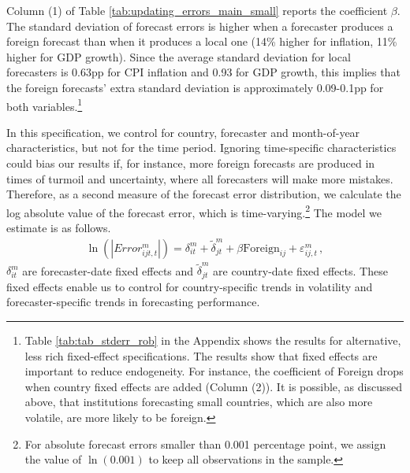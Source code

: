 Column (1) of Table \ref{tab:updating_errors_main_small} reports the coefficient $\beta$. The standard deviation of forecast errors is higher when a forecaster produces a foreign forecast than when it produces a local one (14\% higher for inflation, 11\% higher for GDP growth). Since the average standard deviation for local forecasters is 0.63pp for CPI inflation and 0.93 for GDP growth, this implies that the foreign forecasts' extra standard deviation is approximately 0.09-0.1pp for both variables.\footnote{Table \ref{tab:tab_stderr_rob} in the Appendix shows the results for alternative, less rich fixed-effect specifications. The results show that fixed effects are important to reduce endogeneity. For instance, the coefficient of Foreign drops when country fixed effects are added (Column (2)). It is possible, as discussed above, that institutions forecasting small countries, which are also more volatile, are more likely to be foreign.}

{
	
}


In this specification, we control for country, forecaster and month-of-year characteristics, but not for the time period. Ignoring time-specific characteristics could bias our results if, for instance, more foreign forecasts are produced in times of turmoil and uncertainty, where all forecasters will make more mistakes. Therefore, as a second measure of the forecast error distribution, we calculate the log absolute value of the forecast error, which is time-varying.\footnote{For absolute forecast errors smaller than 0.001 percentage point, we assign the value of $\ln(0.001)$ to keep all observations in the sample.}  The model we estimate is as follows.
\begin{align}
	\ln(|Error_{ijt,t}^m|)= \delta_{it}^m +\tilde\delta_{jt}^m +  \beta \text{Foreign}_{ij} + \varepsilon_{ij,t}^m  \,, \label{eq:regModelFE}
\end{align}
$ \delta_{it}^m$ are forecaster-date fixed effects and $\tilde\delta_{jt}^m$ are country-date fixed effects. These fixed effects enable us to control for country-specific trends in volatility and forecaster-specific trends in forecasting performance.


